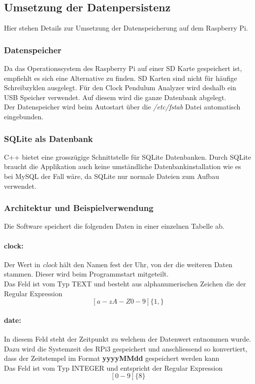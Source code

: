 \subsection{Umsetzung der Datenpersistenz}
    Hier stehen Details zur Umsetzung der Datenspeicherung auf dem Raspberry Pi.
    \subsubsection{Datenspeicher}
    Da das Operationssystem des Raspberry Pi auf einer SD Karte gespeichert ist, empfiehlt es sich eine Alternative zu finden. SD Karten sind nicht für häufige Schreibzyklen ausgelegt. Für den Clock Pendulum Analyzer wird deshalb ein USB Speicher verwendet. Auf diesem wird die ganze Datenbank abgelegt.\\
    Der Datenspeicher wird beim Autostart über die \textit{/etc/fstab} Datei automatisch eingebunden.
    
    \subsubsection{SQLite als Datenbank}
    C++ bietet eine grosszügige Schnittstelle für SQLite Datenbanken. Durch SQLite braucht die Applikation auch keine umständliche Datenbankinstallation wie es bei MySQL der Fall wäre, da SQLite nur normale Dateien zum Aufbau verwendet.
    
    \subsubsection{Architektur und Beispielverwendung}
    Die Software speichert die folgenden Daten in einer einzelnen Tabelle ab.
    \paragraph{clock:}
    Der Wert in \textit{clock} hält den Namen fest der Uhr, von der die weiteren Daten stammen. Dieser wird beim Programmstart mitgeteilt.\\
    Das Feld ist vom Typ TEXT und besteht aus alphanumerischen Zeichen die der Regular Expression $$[a-zA-Z0-9]\{1,\}$$
    \paragraph{date:}\label{sec:db_date}%
    In diesem Feld steht der Zeitpunkt zu welchem der Datenwert entnommen wurde. Dazu wird die Systemzeit des RPi3 gespeichert und anschliessend so konvertiert, dass der Zeitstempel im Format \textbf{yyyyMMdd} gespeichert werden kann\\
    Das Feld ist vom Typ INTEGER und entspricht der Regular Expression
    $$[0-9]\{8\}$$
